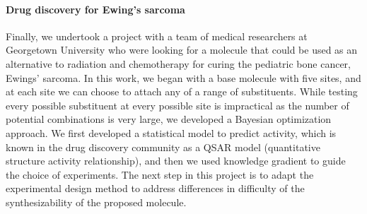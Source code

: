 \documentclass[11pt]{article}
\begin{document}
\paragraph{Drug discovery for Ewing's sarcoma}
Finally, we undertook a project with a team of medical researchers at Georgetown University
who were looking for a molecule that could be used as an alternative to radiation and chemotherapy for curing the pediatric bone cancer, Ewings' sarcoma. In this work, we began with a base molecule with five sites, and at each site we can choose
to attach any of a range of substituents. While testing every possible substituent
at every possible site is impractical as the number of potential combinations is
very large, we developed a Bayesian optimization approach. We first developed a
statistical model to predict activity, which is known in the drug discovery community
as a QSAR model (quantitative structure activity relationship), and then we used
knowledge gradient to guide the choice of experiments. 
The next step in this project is to adapt the experimental design method to address differences in difficulty of the synthesizability of the proposed molecule.

\end{document}
